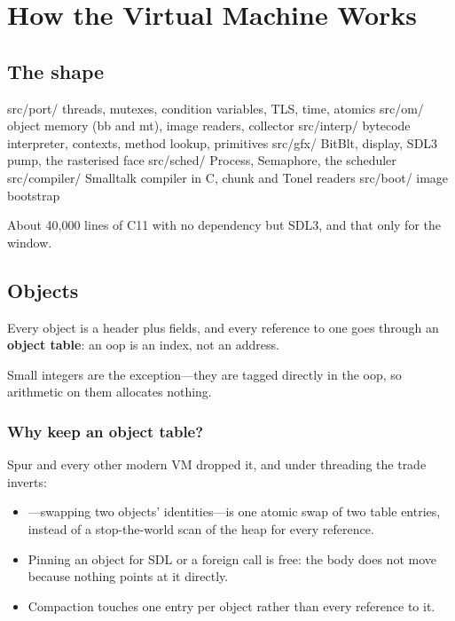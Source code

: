 \chapter{How the Virtual Machine Works}
\label{ch:vm}


\section{The shape}

\begin{plain}
src/port/       threads, mutexes, condition variables, TLS, time, atomics
src/om/         object memory (bb and mt), image readers, collector
src/interp/     bytecode interpreter, contexts, method lookup, primitives
src/gfx/        BitBlt, display, SDL3 pump, the rasterised face
src/sched/      Process, Semaphore, the scheduler
src/compiler/   Smalltalk compiler in C, chunk and Tonel readers
src/boot/       image bootstrap
\end{plain}

About 40,000 lines of C11 with no dependency but SDL3, and that only for the
window.

\section{Objects}

Every object is a header plus fields, and every reference to one goes through
an \textbf{object table}: an oop is an index, not an address.

Small integers are the exception---they are tagged directly in the oop, so
arithmetic on them allocates nothing.

\subsection{Why keep an object table?}

Spur and every other modern VM dropped it, and under threading the trade
inverts:

\begin{itemize}
\item {}---swapping two objects' identities---is one atomic swap of
  two table entries, instead of a stop-the-world scan of the heap for every
  reference.
\item Pinning an object for SDL or a foreign call is free: the body does not
  move because nothing points at it directly.
\item Compaction touches one entry per object rather than every reference to
  it.
\end{itemize}

